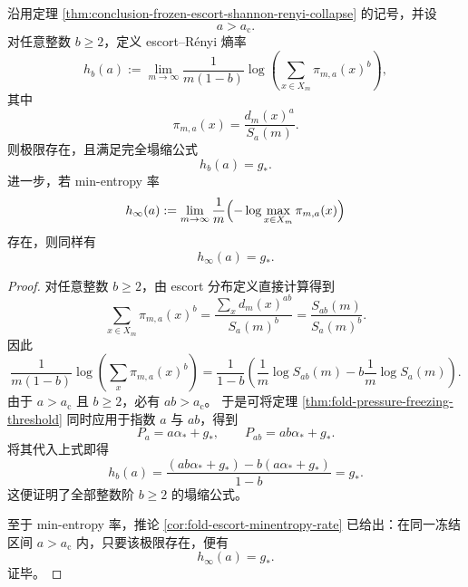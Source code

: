 \begin{theorem}\label{thm:conclusion-frozen-escort-integer-renyi-collapse}
沿用定理 \ref{thm:conclusion-frozen-escort-shannon-renyi-collapse} 的记号，并设
\[
a>a_{\mathrm c}.
\]
对任意整数 \(b\ge 2\)，定义 escort--Rényi 熵率
\[
h_b(a):=
\lim_{m\to\infty}
\frac{1}{m(1-b)}
\log\!\left(\sum_{x\in X_m}\pi_{m,a}(x)^b\right),
\]
其中
\[
\pi_{m,a}(x)=\frac{d_m(x)^a}{S_a(m)}.
\]
则极限存在，且满足完全塌缩公式
\[
h_b(a)=g_\ast.
\]
进一步，若 min-entropy 率
\[
h_\infty(a):=
\lim_{m\to\infty}\frac{1}{m}\Bigl(-\log\max_{x\in X_m}\pi_{m,a}(x)\Bigr)
\]
存在，则同样有
\[
h_\infty(a)=g_\ast.
\]
\end{theorem}
\begin{proof}
对任意整数 \(b\ge 2\)，由 escort 分布定义直接计算得到
\[
\sum_{x\in X_m}\pi_{m,a}(x)^b
=
\frac{\sum_x d_m(x)^{ab}}{S_a(m)^b}
=
\frac{S_{ab}(m)}{S_a(m)^b}.
\]
因此
\[
\frac{1}{m(1-b)}
\log\!\left(\sum_x\pi_{m,a}(x)^b\right)
=
\frac{1}{1-b}
\left(
\frac{1}{m}\log S_{ab}(m)-b\frac{1}{m}\log S_a(m)
\right).
\]
由于 \(a>a_{\mathrm c}\) 且 \(b\ge 2\)，必有 \(ab>a_{\mathrm c}\)。
于是可将定理 \ref{thm:fold-pressure-freezing-threshold} 同时应用于指数 \(a\) 与 \(ab\)，得到
\[
P_a=a\alpha_\ast+g_\ast,
\qquad
P_{ab}=ab\alpha_\ast+g_\ast.
\]
将其代入上式即得
\[
h_b(a)
=
\frac{(ab\alpha_\ast+g_\ast)-b(a\alpha_\ast+g_\ast)}{1-b}
=
g_\ast.
\]
这便证明了全部整数阶 \(b\ge 2\) 的塌缩公式。

至于 min-entropy 率，推论 \ref{cor:fold-escort-minentropy-rate} 已给出：在同一冻结区间 \(a>a_{\mathrm c}\) 内，只要该极限存在，便有
\[
h_\infty(a)=g_\ast.
\]
证毕。
\end{proof}

